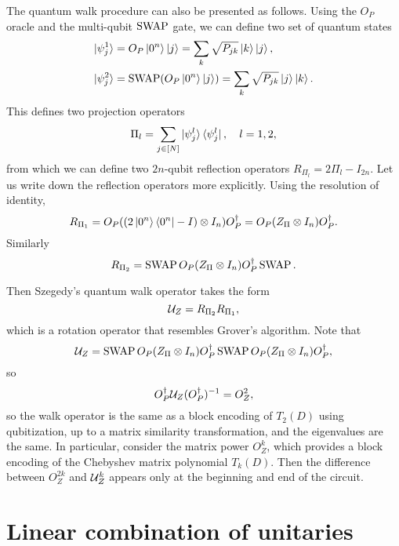 The quantum walk procedure can also be presented as follows.
Using the $O_P$ oracle and the multi-qubit $\operatorname{SWAP}$ gate, we can define two set of quantum states
\begin{equation}
\begin{split}
\ket{\psi_j^{1}}&=O_P\ket{0^n}\ket{j}=\sum_{k}\sqrt{P_{jk}}\ket{k}\ket{j},\\ \ket{\psi_j^{2}}&=\operatorname{SWAP}( O_P\ket{0^n}\ket{j})=\sum_{k}\sqrt{P_{jk}}\ket{j}\ket{k}. \end{split}
\end{equation}
This defines two projection operators
\begin{equation}
\Pi_l=\sum_{j\in[N]}\ket{\psi_j^{l}}\bra{\psi_j^{l}}, \quad l=1,2,
\end{equation}
from which we can define two $2n$-qubit reflection operators $R_{\Pi_l}=2 \Pi_l-I_{2n}$. Let us write down the reflection operators more explicitly. Using the resolution of identity,
\begin{equation}
R_{\Pi_1}=O_P ((2\ket{0^n}\bra{0^n}-I)\otimes I_n)O_P^{\dag}=O_P (Z_{\Pi}\otimes I_n) O_P^{\dag}.
\end{equation}
Similarly
\begin{equation}
R_{\Pi_2}=\operatorname{SWAP}O_P (Z_{\Pi}\otimes I_n) O_P^{\dag}\operatorname{SWAP}.
\end{equation}

Then Szegedy's quantum walk operator takes the form
\begin{equation}
\mathcal{U}_Z=R_{\Pi_2}R_{\Pi_1},
\end{equation}
which is a rotation operator that resembles Grover's algorithm.
Note that
\begin{equation}
\mathcal{U}_Z=\operatorname{SWAP}O_P (Z_{\Pi}\otimes I_n) O_P^{\dag}\operatorname{SWAP}O_P (Z_{\Pi}\otimes I_n) O_P^{\dag},
\end{equation}
so
\begin{equation}
O^{\dag}_P \mathcal{U}_Z (O^{\dag}_P)^{-1}=O_Z^2,
\end{equation}
so the walk operator is the same as a block encoding of $T_2(D)$ using qubitization, up to a matrix similarity transformation, and the eigenvalues are the same. In particular, consider the matrix power $O_Z^k$, which provides a block encoding of the Chebyshev matrix polynomial $T_k(D)$.
Then the difference between $O_Z^{2k}$ and $\mathcal{U}_Z^k$ appears only at the beginning and end of the circuit.

\section{Linear combination of unitaries}\label{sec:lcu}

